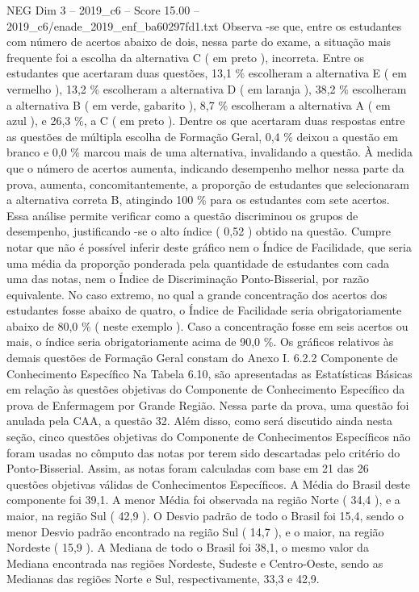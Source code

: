 \begin{textsample}{NEG Dim 3 – 2019\_c6 – Score 15.00 – 2019\_c6/enade\_2019\_enf\_ba60297fd1.txt}
Observa -se que, entre os estudantes com número de acertos abaixo de dois, nessa parte do exame, a situação mais frequente foi a escolha da alternativa C ( em preto ), incorreta.
Entre os estudantes que acertaram duas questões, 13,1 \% escolheram a alternativa E ( em vermelho ), 13,2 \% escolheram a alternativa D ( em laranja ), 38,2 \% escolheram a alternativa B ( em verde, gabarito ), 8,7 \% escolheram a alternativa A ( em azul ), e 26,3 \%, a C ( em preto ).
Dentre os que acertaram duas respostas entre as questões de múltipla escolha de Formação Geral, 0,4 \% deixou a questão em branco e 0,0 \% marcou mais de uma alternativa, invalidando a questão.
À medida que o número de acertos aumenta, indicando desempenho melhor nessa parte da prova, aumenta, concomitantemente, a proporção de estudantes que selecionaram a alternativa correta B, atingindo 100 \% para os estudantes com sete acertos.
Essa análise permite verificar como a questão discriminou os grupos de desempenho, justificando -se o alto índice ( 0,52 ) obtido na questão.
Cumpre notar que não é possível inferir deste gráfico nem o Índice de Facilidade, que seria uma média da proporção ponderada pela quantidade de estudantes com cada uma das notas, nem o Índice de Discriminação Ponto-Bisserial, por razão equivalente.
No caso extremo, no qual a grande concentração dos acertos dos estudantes fosse abaixo de quatro, o Índice de Facilidade seria obrigatoriamente abaixo de 80,0 \% ( neste exemplo ).
Caso a concentração fosse em seis acertos ou mais, o índice seria obrigatoriamente acima de 90,0 \%.
Os gráficos relativos às demais questões de Formação Geral constam do Anexo I. 6.2.2 Componente de Conhecimento Específico Na Tabela 6.10, são apresentadas as Estatísticas Básicas em relação às questões objetivas do Componente de Conhecimento Específico da prova de Enfermagem por Grande Região.
Nessa parte da prova, uma questão foi anulada pela CAA, a questão 32.
Além disso, como será discutido ainda nesta seção, cinco questões objetivas do Componente de Conhecimentos Específicos não foram usadas no cômputo das notas por terem sido descartadas pelo critério do Ponto-Bisserial.
Assim, as notas foram calculadas com base em 21 das 26 questões objetivas válidas de Conhecimentos Específicos.
A Média do Brasil deste componente foi 39,1.
A menor Média foi observada na região Norte ( 34,4 ), e a maior, na região Sul ( 42,9 ).
O Desvio padrão de todo o Brasil foi 15,4, sendo o menor Desvio padrão encontrado na região Sul ( 14,7 ), e o maior, na região Nordeste ( 15,9 ).
A Mediana de todo o Brasil foi 38,1, o mesmo valor da Mediana encontrada nas regiões Nordeste, Sudeste e Centro-Oeste, sendo as Medianas das regiões Norte e Sul, respectivamente, 33,3 e 42,9.

\end{textsample}
